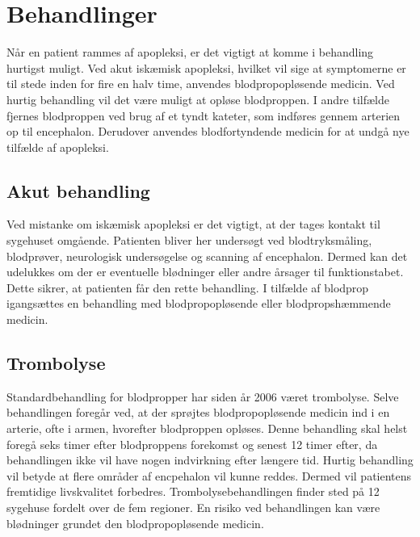 \section{Behandlinger}
Når en patient rammes af apopleksi, er det vigtigt at komme i behandling hurtigst muligt. Ved akut iskæmisk apopleksi, hvilket vil sige at symptomerne er til stede inden for fire en halv time, anvendes blodpropopløsende medicin. Ved hurtig behandling vil det være muligt at opløse blodproppen. I andre tilfælde fjernes blodproppen ved brug af et tyndt kateter, som indføres gennem arterien op til encephalon. Derudover anvendes blodfortyndende medicin for at undgå nye tilfælde af apopleksi. \cite{Hjerteforeningen2014, Kruuse2014a} 

\subsection{Akut behandling}
Ved mistanke om iskæmisk apopleksi er det vigtigt, at der tages kontakt til sygehuset omgående. Patienten bliver her undersøgt ved blodtryksmåling, blodprøver, neurologisk undersøgelse og scanning af encephalon. Dermed kan det udelukkes om der er eventuelle blødninger eller andre årsager til funktionstabet. Dette  sikrer, at patienten får den rette behandling. I tilfælde af blodprop igangsættes en behandling med blodpropopløsende eller blodpropshæmmende medicin. \cite{Hjerteforeningen2014, Kruuse2014a} 

\subsection{Trombolyse}
Standardbehandling for blodpropper har siden år 2006 været trombolyse. Selve behandlingen foregår ved, at der sprøjtes blodpropopløsende medicin ind i en arterie, ofte i armen, hvorefter blodproppen opløses. Denne behandling skal helst foregå seks timer efter blodproppens forekomst og senest 12 timer efter, da behandlingen ikke vil have nogen indvirkning efter længere tid. Hurtig behandling vil betyde at flere områder af encpehalon vil kunne reddes. Dermed vil patientens fremtidige livskvalitet forbedres. Trombolysebehandlingen finder sted på 12 sygehuse fordelt over de fem regioner. En risiko ved behandlingen kan være blødninger grundet den blodpropopløsende medicin. \cite{Hjernesagen2015b} 

